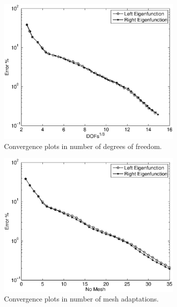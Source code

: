 \documentclass[smallextended]{svjour3}
\begin{document}
\begin{figure}[!ht]
\begin{center}
\includegraphics[width=0.8\textwidth]{dofs.eps}
\end{center}
\caption{Convergence plots in number of degrees of freedom.}
\label{fig:conv1}
\end{figure}

\begin{figure}[!ht]
\begin{center}
\includegraphics[width=0.8\textwidth]{mesh.eps}
\end{center}
\caption{Convergence plots in number of mesh adaptations.}
\label{fig:conv2}
\end{figure}
\end{document}
